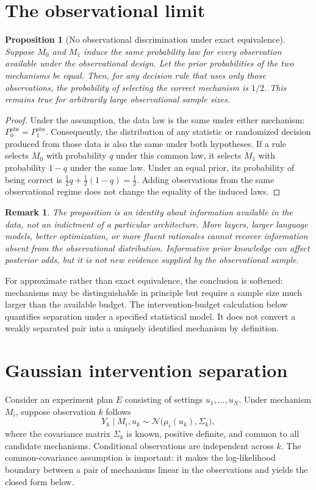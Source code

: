 \documentclass[11pt]{article}
\newtheorem{proposition}{Proposition}[section]
\newtheorem{remark}{Remark}[section]
\begin{document}
\section{The observational limit}
\begin{proposition}[No observational discrimination under exact equivalence]
Suppose $M_0$ and $M_1$ induce the same probability law for every observation available under the observational design. Let the prior probabilities of the two mechanisms be equal. Then, for any decision rule that uses only those observations, the probability of selecting the correct mechanism is $1/2$. This remains true for arbitrarily large observational sample sizes.
\end{proposition}
\begin{proof}
Under the assumption, the data law is the same under either mechanism: $P_0^{\mathrm{obs}}=P_1^{\mathrm{obs}}$. Consequently, the distribution of any statistic or randomized decision produced from those data is also the same under both hypotheses. If a rule selects $M_0$ with probability $q$ under this common law, it selects $M_1$ with probability $1-q$ under the same law. Under an equal prior, its probability of being correct is $\frac12q+\frac12(1-q)=\frac12$. Adding observations from the same observational regime does not change the equality of the induced laws.
\end{proof}

\begin{remark}
The proposition is an identity about information available in the data, not an indictment of a particular architecture. More layers, larger language models, better optimization, or more fluent rationales cannot recover information absent from the observational distribution. Informative prior knowledge can affect posterior odds, but it is not new evidence supplied by the observational sample.
\end{remark}

For approximate rather than exact equivalence, the conclusion is softened: mechanisms may be distinguishable in principle but require a sample size much larger than the available budget. The intervention-budget calculation below quantifies separation under a specified statistical model. It does not convert a weakly separated pair into a uniquely identified mechanism by definition.

\section{Gaussian intervention separation}
Consider an experiment plan $E$ consisting of settings $u_1,\ldots,u_N$. Under mechanism $M_i$, suppose observation $k$ follows
\begin{equation}
Y_k\mid M_i,u_k\sim\mathcal{N}\big(\mu_i(u_k),\Sigma_k\big),
\end{equation}
where the covariance matrix $\Sigma_k$ is known, positive definite, and common to all candidate mechanisms. Conditional observations are independent across $k$. The common-covariance assumption is important: it makes the log-likelihood boundary between a pair of mechanisms linear in the observations and yields the closed form below.
\end{document}

